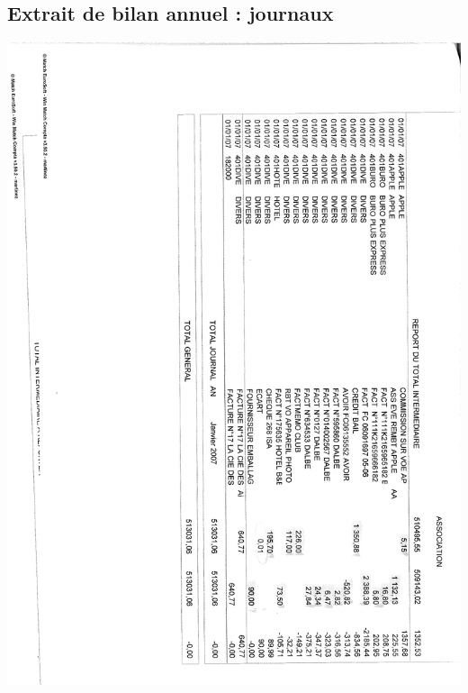 \subsection{Extrait de bilan annuel : journaux}
\begin{center}
\includegraphics[scale=0.7]{annexes/images/bilan_annuel_journaux_b.pdf}
\end{center}
